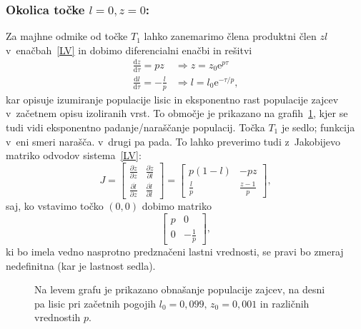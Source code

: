 \documentclass[a4paper,pdftex,10pt]{article}
\numberwithin{equation}{section} %
\numberwithin{figure}{section} %
\numberwithin{table}{section} %
\begin{document}
\subsubsection*{Okolica točke $l=0, z=0$:}
Za majhne odmike od točke $T_1$ lahko zanemarimo člena produktni člen $zl$ 
v~enačbah~\ref{LV} in dobimo diferencialni enačbi in rešitvi
\begin{align*}
    \frac{\mathrm{d}z}{\mathrm{d}\tau} = p z &\Rightarrow z = z_0 \mathrm{e}^{p\tau} \\
    \frac{\mathrm{d}l}{\mathrm{d}\tau} = -\frac{l}{p} &\Rightarrow l = l_0 
    \mathrm{e}^{-\tau/p},
\end{align*}
kar opisuje izumiranje populacije lisic in eksponentno rast populacije zajcev v~začetnem
opisu izoliranih vrst. To območje je prikazano na grafih~\ref{slika6}, kjer se tudi vidi
eksponentno padanje/naraščanje populacij.
Točka $T_1$ je sedlo; funkcija v~eni smeri narašča. v~drugi pa pada. To lahko preverimo
tudi z~Jakobijevo matriko odvodov sistema~\ref{LV}:
\begin{equation}\label{Jacobi}
    J = \begin{bmatrix}
	\frac{\partial \dot{z}}{\partial z} 
	& \frac{\partial \dot{z}}{\partial l} \\
	\frac{\partial \dot{l}}{\partial z} 
	& \frac{\partial \dot{l}}{\partial l} 
    \end{bmatrix} = 
    \begin{bmatrix}
	p(1-l) & -pz \\
	\frac{l}{p} & \frac{z-1}{p}
    \end{bmatrix},
\end{equation}
saj, ko vstavimo točko $(0,0)$ dobimo matriko
\begin{equation}
    \begin{bmatrix}
	p & 0 \\
	0 & -\frac{1}{p}
    \end{bmatrix},
\end{equation}
ki bo imela vedno nasprotno predznačeni lastni vrednosti, se pravi bo zmeraj nedefinitna
(kar je lastnost sedla).

\begin{figure}    
    \centering
    \resizebox{0.8\textwidth}{!}{}
    \caption{Na levem grafu je prikazano obnašanje populacije zajcev, na desni pa lisic
    pri začetnih pogojih $l_0=0,099, \, z_0=0,001$ in različnih vrednostih $p$.}
    \label{slika6}
\end{figure}
\end{document}
